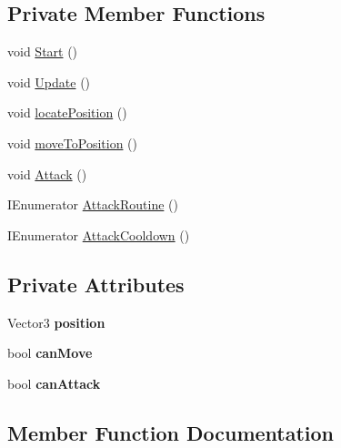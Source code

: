 \subsection*{Private Member Functions}
\begin{DoxyCompactItemize}
\item 
void \hyperlink{class_click_to_move_ab5f10418f80164154a69d18809fec30d}{Start} ()
\item 
void \hyperlink{class_click_to_move_aa9c5f267b0b5ad54a2444aaddec00862}{Update} ()
\item 
void \hyperlink{class_click_to_move_ad8ff402015f7fb9e9e850400ca47e47b}{locate\+Position} ()
\item 
void \hyperlink{class_click_to_move_add7581013c28bc5180a4111a196cec41}{move\+To\+Position} ()
\item 
void \hyperlink{class_click_to_move_a7a22f9529f61a4da097d950d65b5bcaa}{Attack} ()
\item 
I\+Enumerator \hyperlink{class_click_to_move_a81c5db2ca3553c2bb0cd6473437a5561}{Attack\+Routine} ()
\item 
I\+Enumerator \hyperlink{class_click_to_move_a9ec6685677f20e880a600762dd64d22a}{Attack\+Cooldown} ()
\end{DoxyCompactItemize}
\subsection*{Private Attributes}
\begin{DoxyCompactItemize}
\item 
\mbox{\label{class_click_to_move_afd98b037b9175c78885ad6a7815a11b8}} 
Vector3 {\bfseries position}
\item 
\mbox{\label{class_click_to_move_acad5001efecf12cd5a0e326bbab8b6c8}} 
bool {\bfseries can\+Move}
\item 
\mbox{\label{class_click_to_move_ae7968592257870641fce73765fda4c12}} 
bool {\bfseries can\+Attack}
\end{DoxyCompactItemize}


\subsection{Member Function Documentation}
\mbox{\label{class_click_to_move_a7a22f9529f61a4da097d950d65b5bcaa}} 
